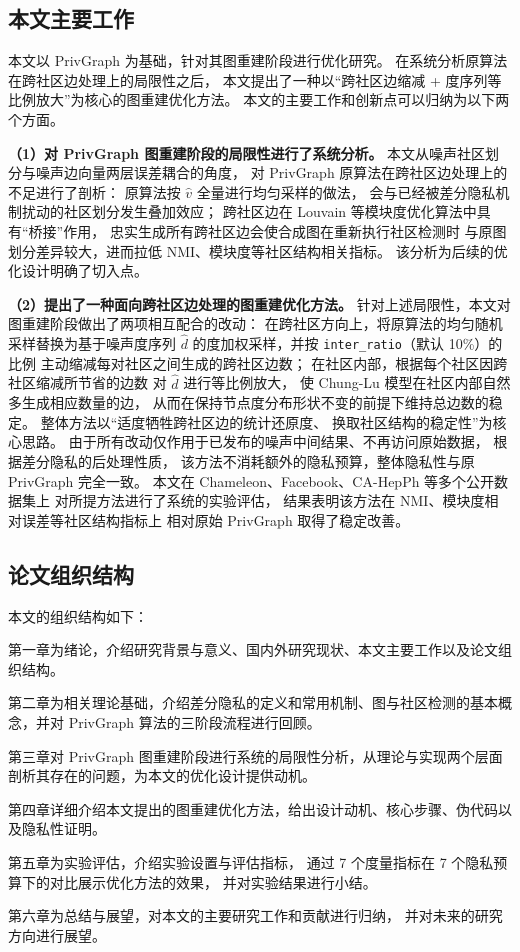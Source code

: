 \subsection{本文主要工作}

\par 本文以 PrivGraph 为基础，针对其图重建阶段进行优化研究。
在系统分析原算法在跨社区边处理上的局限性之后，
本文提出了一种以``跨社区边缩减 + 度序列等比例放大''为核心的图重建优化方法。
本文的主要工作和创新点可以归纳为以下两个方面。

\par \textbf{（1）对 PrivGraph 图重建阶段的局限性进行了系统分析。}
本文从噪声社区划分与噪声边向量两层误差耦合的角度，
对 PrivGraph 原算法在跨社区边处理上的不足进行了剖析：
原算法按 $\hat{v}$ 全量进行均匀采样的做法，
会与已经被差分隐私机制扰动的社区划分发生叠加效应；
跨社区边在 Louvain 等模块度优化算法中具有``桥接''作用，
忠实生成所有跨社区边会使合成图在重新执行社区检测时
与原图划分差异较大，进而拉低 NMI、模块度等社区结构相关指标。
该分析为后续的优化设计明确了切入点。

\par \textbf{（2）提出了一种面向跨社区边处理的图重建优化方法。}
针对上述局限性，本文对图重建阶段做出了两项相互配合的改动：
在跨社区方向上，将原算法的均匀随机采样替换为基于噪声度序列 $\hat{d}$
的度加权采样，并按 \texttt{inter\_ratio}（默认 10\%）的比例
主动缩减每对社区之间生成的跨社区边数；
在社区内部，根据每个社区因跨社区缩减所节省的边数
对 $\hat{d}$ 进行等比例放大，
使 Chung-Lu 模型在社区内部自然多生成相应数量的边，
从而在保持节点度分布形状不变的前提下维持总边数的稳定。
整体方法以``适度牺牲跨社区边的统计还原度、
换取社区结构的稳定性''为核心思路。
由于所有改动仅作用于已发布的噪声中间结果、不再访问原始数据，
根据差分隐私的后处理性质，
该方法不消耗额外的隐私预算，整体隐私性与原 PrivGraph 完全一致。
本文在 Chameleon、Facebook、CA-HepPh 等多个公开数据集上
对所提方法进行了系统的实验评估，
结果表明该方法在 NMI、模块度相对误差等社区结构指标上
相对原始 PrivGraph 取得了稳定改善。
\subsection{论文组织结构}

\par 本文的组织结构如下：

\par 第一章为绪论，介绍研究背景与意义、国内外研究现状、本文主要工作以及论文组织结构。

\par 第二章为相关理论基础，介绍差分隐私的定义和常用机制、图与社区检测的基本概念，并对 PrivGraph 算法的三阶段流程进行回顾。

\par 第三章对 PrivGraph 图重建阶段进行系统的局限性分析，从理论与实现两个层面剖析其存在的问题，为本文的优化设计提供动机。

\par 第四章详细介绍本文提出的图重建优化方法，给出设计动机、核心步骤、伪代码以及隐私性证明。

\par 第五章为实验评估，介绍实验设置与评估指标，
通过 7 个度量指标在 7 个隐私预算下的对比展示优化方法的效果，
并对实验结果进行小结。

\par 第六章为总结与展望，对本文的主要研究工作和贡献进行归纳，
并对未来的研究方向进行展望。